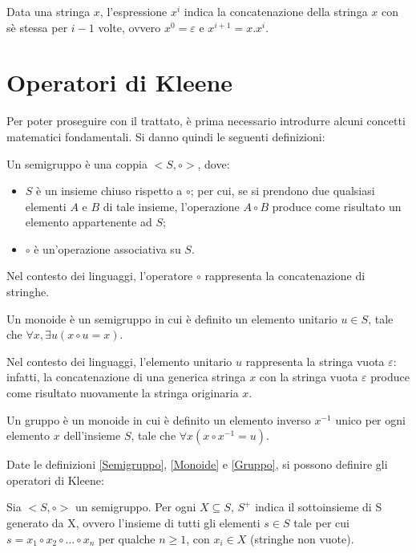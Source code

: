   Data una stringa \(x\), l'espressione \(x^i\) indica la concatenazione della stringa \(x\) con sè stessa per \(i-1\) volte, ovvero \(x^0 = \varepsilon\) e \(x^{i+1} = x.x^{i}\).

  \section{Operatori di Kleene}
  Per poter proseguire con il trattato, è prima necessario introdurre alcuni concetti matematici fondamentali. Si danno quindi le seguenti definizioni:
  \begin{definition}[Semigruppo] \label{Semigruppo}
    Un semigruppo è una coppia \(<S, \circ >\), dove:
    \begin{itemize}
      \item \(S\) è un insieme chiuso rispetto a \(\circ\); per cui, se si prendono due qualsiasi elementi \(A\) e \(B\) di tale insieme, l'operazione \(A\circ B\) produce come risultato un elemento appartenente ad \(S\);
      \item \(\circ\) è un'operazione associativa su \(S\).
    \end{itemize}
  \end{definition}

  Nel contesto dei linguaggi, l'operatore \(\circ\) rappresenta la concatenazione di stringhe.
  
  \begin{definition}[Monoide] \label{Monoide}
    Un monoide è un semigruppo in cui è definito un elemento unitario \(u\in S\), tale che \(\forall x, \exists u(x\circ u = x)\).
  \end{definition}

  Nel contesto dei linguaggi, l'elemento unitario \(u\) rappresenta la stringa vuota \(\varepsilon\): infatti, la concatenazione di una generica stringa \(x\) con la stringa vuota \(\varepsilon\) produce come risultato nuovamente la stringa originaria \(x\). 

  \begin{definition}[Gruppo] \label{Gruppo}
    Un gruppo è un monoide in cui è definito un elemento inverso \(x^{-1}\) unico per ogni elemento \(x\) dell'insieme \(S\), tale che \(\forall x(x\circ x^{-1} = u)\).
  \end{definition}

  Date le definizioni \ref{Semigruppo}, \ref{Monoide} e \ref{Gruppo}, si possono definire gli operatori di Kleene:

  \begin{definition} 
    Sia \(<S, \circ>\) un semigruppo. Per ogni \(X\subseteq S\), \(S^+\) indica il sottoinsieme di S generato da X, ovvero l'insieme di tutti gli elementi \(s\in S\) tale per cui \(s=x_1\circ x_2\circ...\circ x_n\) per qualche \(n\geq 1\), con \(x_i\in X\) (stringhe non vuote).
  \end{definition}

